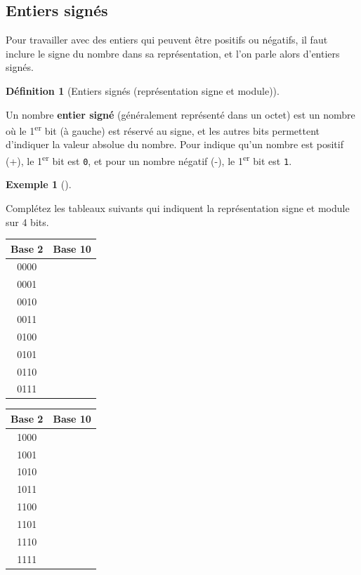 \documentclass[
  letterpaper,
]{scrbook}
\theoremstyle{plain}
\theoremstyle{definition}
\newtheorem{example}{Exemple}[chapter]
\theoremstyle{definition}
\newtheorem{definition}{Définition}[chapter]
\theoremstyle{remark}
\begin{document}
\hypertarget{entiers-signuxe9s}{%
\subsection{Entiers signés}\label{entiers-signuxe9s}}

Pour travailler avec des entiers qui peuvent être positifs ou négatifs,
il faut inclure le signe du nombre dans sa représentation, et l'on parle
alors d'entiers signés.

\leavevmode{}%
\begin{definition}[Entiers signés (représentation signe et
module)]\label{def-entiers-signes}

Un nombre \textbf{entier signé} (généralement représenté dans un octet)
est un nombre où le 1\textsuperscript{er} bit (à gauche) est réservé au
signe, et les autres bits permettent d'indiquer la valeur absolue du
nombre. Pour indique qu'un nombre est positif (+), le
1\textsuperscript{er} bit est \texttt{0}, et pour un nombre négatif (-),
le 1\textsuperscript{er} bit est \texttt{1}.

\end{definition}

\leavevmode{}%
\begin{example}[]\label{exm-completion-tableau-signe-module-4-bits}

Complétez les tableaux suivants qui indiquent la représentation signe et
module sur 4 bits.

\begin{longtable}[]{@{}cc@{}}
\toprule()
\textbf{Base 2} & \textbf{Base 10} \\
\midrule()
\endhead
0000 & \\
0001 & \\
0010 & \\
0011 & \\
0100 & \\
0101 & \\
0110 & \\
0111 & \\
\bottomrule()
\end{longtable}

\begin{longtable}[]{@{}cc@{}}
\toprule()
\textbf{Base 2} & \textbf{Base 10} \\
\midrule()
\endhead
1000 & \\
1001 & \\
1010 & \\
1011 & \\
1100 & \\
1101 & \\
1110 & \\
1111 & \\
\bottomrule()
\end{longtable}

\end{example}
\end{document}
